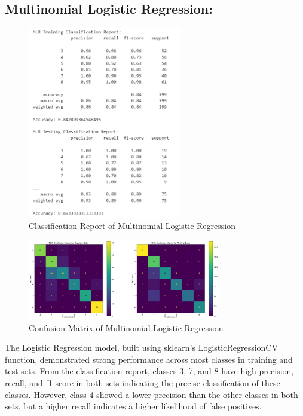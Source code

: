 \documentclass[11pt, letterpaper]{article}
\begin{document}
    \noindent\subsection*{Multinomial Logistic Regression:}
    
    \begin{figure}[H]
        \centering
        \includegraphics[width=0.60\textwidth]{mlr-classification-report.png}
        \caption{Classification Report of Multinomial Logistic Regression}
        \label{fig:class-report-mlr}
    \end{figure}

    \begin{figure}[H]
        \centering
        \includegraphics[width=0.75\textwidth]{mlr-confusion-matrix.png}
        \caption{Confusion Matrix of Multinomial Logistic Regression}
        \label{fig:confusion-matrix-mlr}
    \end{figure}

    \noindent The Logistic Regression model, built using sklearn’s LogisticRegressionCV function, demonstrated strong performance across most classes in training and test sets. From the classification report, classes 3, 7, and 8 have high precision, recall, and f1-score in both sets indicating the precise classification of these classes. However, class 4 showed a lower precision than the other classes in both sets, but a higher recall indicates a higher likelihood of false positives.\\
    
\end{document}
